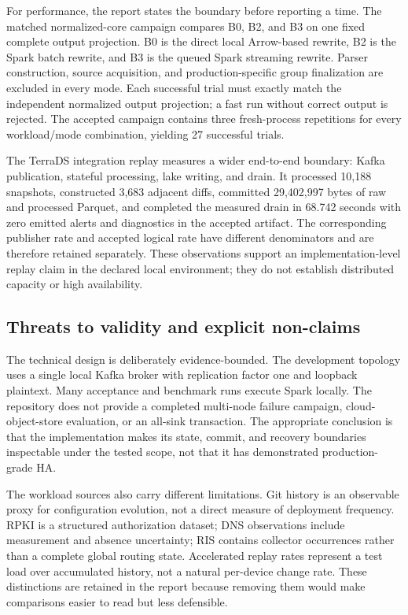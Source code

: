 \documentclass[a4paper,11pt]{article}
\begin{document}
For performance, the report states the boundary before reporting a time. The matched normalized-core campaign compares B0, B2, and B3 on one fixed complete output projection. B0 is the direct local Arrow-based rewrite, B2 is the Spark batch rewrite, and B3 is the queued Spark streaming rewrite. Parser construction, source acquisition, and production-specific group finalization are excluded in every mode. Each successful trial must exactly match the independent normalized output projection; a fast run without correct output is rejected. The accepted campaign contains three fresh-process repetitions for every workload/mode combination, yielding 27 successful trials.

The TerraDS integration replay measures a wider end-to-end boundary: Kafka publication, stateful processing, lake writing, and drain. It processed 10,188 snapshots, constructed 3,683 adjacent diffs, committed 29,402,997 bytes of raw and processed Parquet, and completed the measured drain in 68.742 seconds with zero emitted alerts and diagnostics in the accepted artifact. The corresponding publisher rate and accepted logical rate have different denominators and are therefore retained separately. These observations support an implementation-level replay claim in the declared local environment; they do not establish distributed capacity or high availability.

\subsection{Threats to validity and explicit non-claims}

The technical design is deliberately evidence-bounded. The development topology uses a single local Kafka broker with replication factor one and loopback plaintext. Many acceptance and benchmark runs execute Spark locally. The repository does not provide a completed multi-node failure campaign, cloud-object-store evaluation, or an all-sink transaction. The appropriate conclusion is that the implementation makes its state, commit, and recovery boundaries inspectable under the tested scope, not that it has demonstrated production-grade HA.

The workload sources also carry different limitations. Git history is an observable proxy for configuration evolution, not a direct measure of deployment frequency. RPKI is a structured authorization dataset; DNS observations include measurement and absence uncertainty; RIS contains collector occurrences rather than a complete global routing state. Accelerated replay rates represent a test load over accumulated history, not a natural per-device change rate. These distinctions are retained in the report because removing them would make comparisons easier to read but less defensible.
\end{document}
